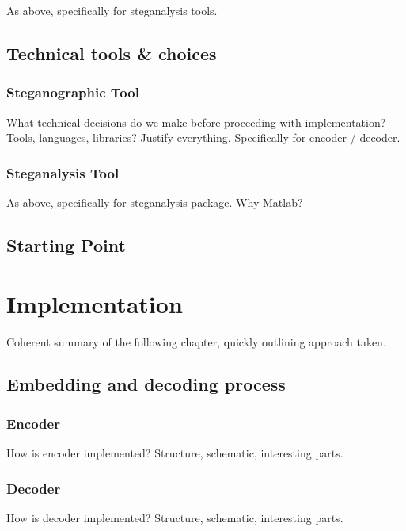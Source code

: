 \documentclass[12pt,british,twoside,notitlepage,usenames,dvipsnames,hypens,final]{report}
\numberwithin{equation}{section}
\numberwithin{figure}{section}
\begin{document}
As above, specifically for steganalysis tools.

\section{Technical tools \& choices}

\subsection{Steganographic Tool}

What technical decisions do we make before proceeding with implementation? Tools, languages, libraries? Justify everything.
Specifically for encoder / decoder. 

\subsection{Steganalysis Tool}

As above, specifically for steganalysis package. Why Matlab?

\section{Starting Point}


\cleardoublepage
\chapter{Implementation}

Coherent summary of the following chapter, quickly outlining approach taken.

\section{Embedding and decoding process}

\subsection{Encoder}

How is encoder implemented? Structure, schematic, interesting parts. 

\subsection{Decoder}

How is decoder implemented? Structure, schematic, interesting parts. 
\end{document}
